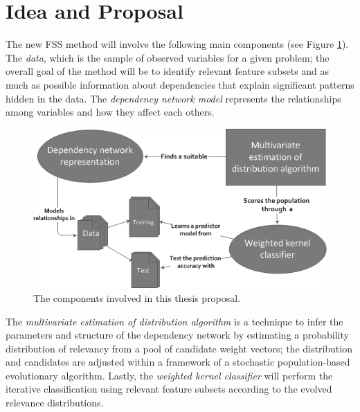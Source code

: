 
\section{Idea and Proposal}
\label{sec:IdAndProp}

The new FSS method will involve the following main components (see Figure \ref{fig:im02}). The \emph{data}, which is the sample of observed variables for a given problem; the overall goal of the method will be to identify relevant feature subsets and as much as possible information about dependencies that explain significant patterns hidden in the data.  The \emph{dependency network model} represents the relationships among variables and how they affect each others.  

\begin{figure}[ht]
	\centering
		\includegraphics{Images/components.jpg}
	\caption{The components involved in this thesis proposal.}
	\label{fig:im02}
\end{figure}

The \emph{multivariate estimation of distribution algorithm} is a technique to infer the parameters and structure of the dependency network by estimating a probability distribution of relevancy from a pool of candidate weight vectors; the distribution and candidates are adjusted within a framework of a stochastic population-based evolutionary algorithm. Lastly, the \emph{weighted kernel classifier} will perform the iterative classification using relevant feature subsets according to the evolved relevance distributions.

